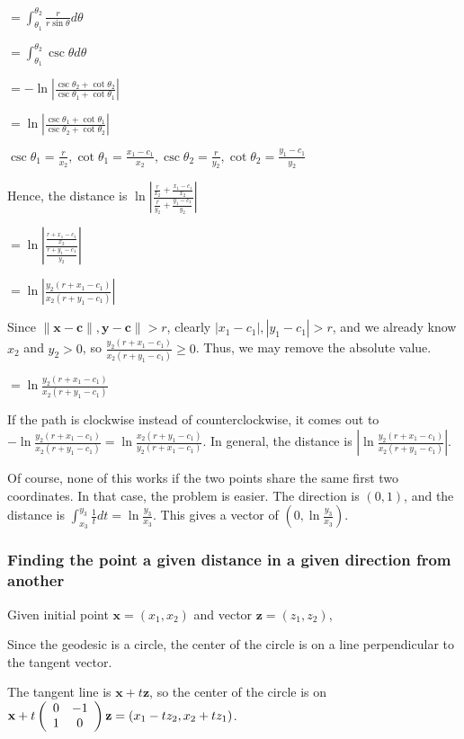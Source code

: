 $= \int_{\theta_1}^{\theta_2} \frac{r}{r\sin\theta} d\theta$

$= \int_{\theta_1}^{\theta_2} \csc\theta d\theta$

$= -\ln\left|\frac{\csc\theta_2+\cot\theta_2}{\csc\theta_1+\cot\theta_1}\right|$

$= \ln\left|\frac{\csc\theta_1+\cot\theta_1}{\csc\theta_2+\cot\theta_2}\right|$

$\csc\theta_1 = \frac{r}{x_2}, \cot\theta_1 = \frac{x_1-c_1}{x_2}, \csc\theta_2 = \frac{r}{y_2}, \cot\theta_2 = \frac{y_1-c_1}{y_2}$

Hence, the distance is $\ln\left|\frac{\frac{r}{x_2}+\frac{x_1-c_1}{x_2}}{\frac{r}{y_2}+\frac{y_1-c_1}{y_2}}\right|$

$= \ln\left|\frac{\frac{r+x_1-c_1}{x_2}}{\frac{r+y_1-c_1}{y_2}}\right|$

$= \ln\left|\frac{y_2(r+x_1-c_1)}{x_2(r+y_1-c_1)}\right|$

Since $\|\textbf{x}-\textbf{c}\|, \textbf{y}-\textbf{c}\| > r$, clearly $|x_1-c_1|, |y_1-c_1| > r$, and we already know $x_2$ and $y_2 > 0$, so $\frac{y_2(r+x_1-c_1)}{x_2(r+y_1-c_1)} \geq 0$. Thus, we may remove the absolute value.

$= \ln\frac{y_2(r+x_1-c_1)}{x_2(r+y_1-c_1)}$

If the path is clockwise instead of counterclockwise, it comes out to $-\ln\frac{y_2(r+x_1-c_1)}{x_2(r+y_1-c_1)} = \ln\frac{x_2(r+y_1-c_1)}{y_2(r+x_1-c_1)}$. In general, the distance is $\left|\ln\frac{y_2(r+x_1-c_1)}{x_2(r+y_1-c_1)}\right|$.

Of course, none of this works if the two points share the same first two coordinates. In that case, the problem is easier. The direction is $(0,1)$, and the distance is $\int_{x_3}^{y_3} \frac{1}{t} dt = \ln\frac{y_3}{x_3}$. This gives a vector of $(0,\ln\frac{y_3}{x_3})$.

\subsubsection{Finding the point a given distance in a given direction from another}

Given initial point $\textbf{x} = (x_1,x_2)$ and vector $\textbf{z} = (z_1,z_2)$,

Since the geodesic is a circle, the center of the circle is on a line perpendicular to the tangent vector.

The tangent line is $\textbf{x}+t\textbf{z}$, so the center of the circle is on $\textbf{x}+t\left(\begin{array}{ccc} 0 & -1 \\1 & 0 \end{array} \right)\textbf{z} = (x_1-tz_2,x_2+tz_1)$.

